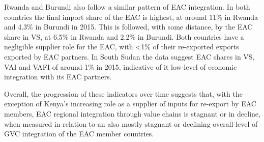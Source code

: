\documentclass[a4paper]{article}
\begin{document}
 Rwanda and Burundi also follow a similar pattern of EAC integration. In both countries the final import share of the EAC is highest, at around 11\% in Rwanda and 4.3\% in Burundi in 2015. This is followed, with some distance, by the EAC share in VS, at 6.5\% in Rwanda and 2.2\% in Burundi. Both countries have a negligible supplier role for the EAC, with <1\% of their re-exported exports exported by EAC partners. In South Sudan the data suggest EAC shares in VS, VAI and VAFI of around 1\% in 2015, indicative of it low-level of economic integration with its EAC partners. \newline 
 
 Overall, the progression of these indicators over time suggests that, with the exception of Kenya's increasing role as a supplier of inputs for re-export by EAC members, EAC regional integration through value chains is stagnant or in decline, when measured in relation to an also mostly stagnant or declining overall level of GVC integration of the EAC member countries. 




\end{document}
